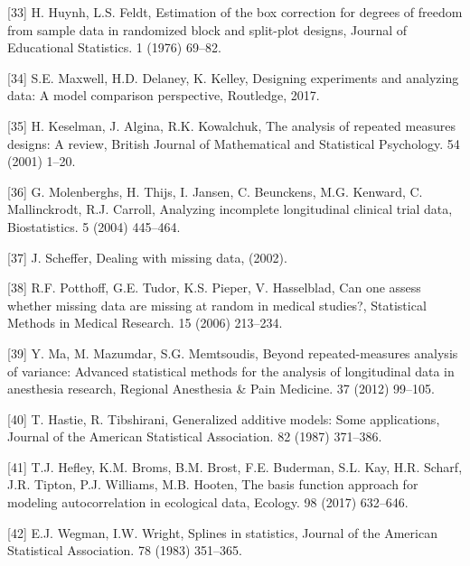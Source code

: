 \documentclass[
]{article}
\begin{document}
\leavevmode\hypertarget{ref-huynh1976}{}%
{[}33{]} H. Huynh, L.S. Feldt, Estimation of the box correction for degrees of freedom from sample data in randomized block and split-plot designs, Journal of Educational Statistics. 1 (1976) 69--82.

\leavevmode\hypertarget{ref-maxwell2017}{}%
{[}34{]} S.E. Maxwell, H.D. Delaney, K. Kelley, Designing experiments and analyzing data: A model comparison perspective, Routledge, 2017.

\leavevmode\hypertarget{ref-keselman2001}{}%
{[}35{]} H. Keselman, J. Algina, R.K. Kowalchuk, The analysis of repeated measures designs: A review, British Journal of Mathematical and Statistical Psychology. 54 (2001) 1--20.

\leavevmode\hypertarget{ref-molenberghs2004}{}%
{[}36{]} G. Molenberghs, H. Thijs, I. Jansen, C. Beunckens, M.G. Kenward, C. Mallinckrodt, R.J. Carroll, Analyzing incomplete longitudinal clinical trial data, Biostatistics. 5 (2004) 445--464.

\leavevmode\hypertarget{ref-scheffer2002}{}%
{[}37{]} J. Scheffer, Dealing with missing data, (2002).

\leavevmode\hypertarget{ref-potthoff2006}{}%
{[}38{]} R.F. Potthoff, G.E. Tudor, K.S. Pieper, V. Hasselblad, Can one assess whether missing data are missing at random in medical studies?, Statistical Methods in Medical Research. 15 (2006) 213--234.

\leavevmode\hypertarget{ref-ma2012}{}%
{[}39{]} Y. Ma, M. Mazumdar, S.G. Memtsoudis, Beyond repeated-measures analysis of variance: Advanced statistical methods for the analysis of longitudinal data in anesthesia research, Regional Anesthesia \& Pain Medicine. 37 (2012) 99--105.

\leavevmode\hypertarget{ref-hastie1987}{}%
{[}40{]} T. Hastie, R. Tibshirani, Generalized additive models: Some applications, Journal of the American Statistical Association. 82 (1987) 371--386.

\leavevmode\hypertarget{ref-hefley2017}{}%
{[}41{]} T.J. Hefley, K.M. Broms, B.M. Brost, F.E. Buderman, S.L. Kay, H.R. Scharf, J.R. Tipton, P.J. Williams, M.B. Hooten, The basis function approach for modeling autocorrelation in ecological data, Ecology. 98 (2017) 632--646.

\leavevmode\hypertarget{ref-wegman1983}{}%
{[}42{]} E.J. Wegman, I.W. Wright, Splines in statistics, Journal of the American Statistical Association. 78 (1983) 351--365.
\end{document}
